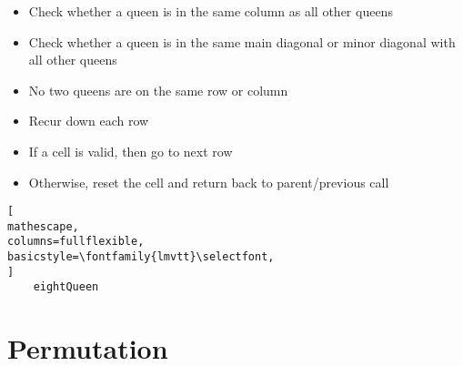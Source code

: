 \documentclass{article}
\begin{document}
\begin{itemize}
\item[] Check whether a queen is in the same column as all other queens 
\item[] Check whether a queen is in the same main diagonal or minor diagonal with all other queens
\end{itemize}

\begin{itemize}
\item[] No two queens are on the same row or column
\item[] Recur down each row 
\item[] If a cell is valid, then go to next row 
\item[] Otherwise, reset the cell and return back to parent/previous call
\end{itemize}

\begin{lstlisting}[
mathescape,
columns=fullflexible,
basicstyle=\fontfamily{lmvtt}\selectfont,
]
    eightQueen
\end{lstlisting} 
\section{Permutation}
\end{document}
